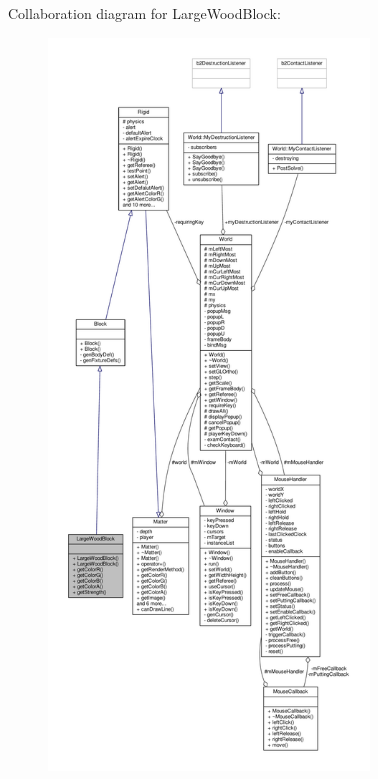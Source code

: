 Collaboration diagram for Large\+Wood\+Block\+:
\nopagebreak
\begin{figure}[H]
\begin{center}
\leavevmode
\includegraphics[height=550pt]{classLargeWoodBlock__coll__graph}
\end{center}
\end{figure}
